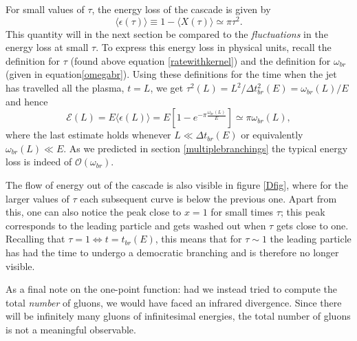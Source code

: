\documentclass[a4paper,12pt]{article}
\numberwithin{equation}{section}
\begin{document}
For small values of $\tau$, the energy loss of the cascade is given by
\begin{equation}\label{epsilon}
 \langle \epsilon(\tau) \rangle \equiv 1- \langle X(\tau)\rangle \simeq \pi \tau^2.
\end{equation}
This quantity will in the next section be compared to the \emph{fluctuations} in the energy loss at small $\tau$. To express this energy loss in physical units, recall the definition for $\tau$ (found above equation \eqref{ratewithkernel}) and the definition for $\omega_{br}$ (given in equation\eqref{omegabr}). Using these definitions for the time when the jet has travelled all the plasma, $t=L$, we get $\tau^2(L)=L^2/\Delta t^2_{br}(E)=\omega_{br}(L)/E$ and hence 
\begin{equation}
\mathcal{E}(L)=E\langle \epsilon(L) \rangle = E \left[ 1-e^{-\pi \frac{\omega_{br}(L)}{E}} \right] \simeq \pi \omega_{br}(L),
\end{equation}
where the last estimate holds whenever $L\ll \Delta t_{br}(E)$ or equivalently $\omega_{br}(L) \ll E$. As we predicted in section \ref{multiplebranchings} the typical energy loss is indeed of $\mathcal{O}(\omega_{br})$.


The flow of energy out of the cascade is also visible in figure \ref{Dfig}, where for the larger values of $\tau$ each subsequent curve is below the previous one. Apart from this, one can also notice the peak close to $x=1$ for small times $\tau$; this peak corresponds to the leading particle and gets washed out when $\tau$ gets close to one. Recalling that $\tau=1 \Leftrightarrow t=t_{br}(E)$, this means that for $\tau \sim 1$ the leading particle has had the time to undergo a democratic branching and is therefore no longer visible.



As a final note on the one-point function: had we instead tried to compute the total \emph{number} of gluons, we would have faced an infrared divergence. Since there will be infinitely many gluons of infinitesimal energies, the total number of gluons is not a meaningful observable.
\end{document}
